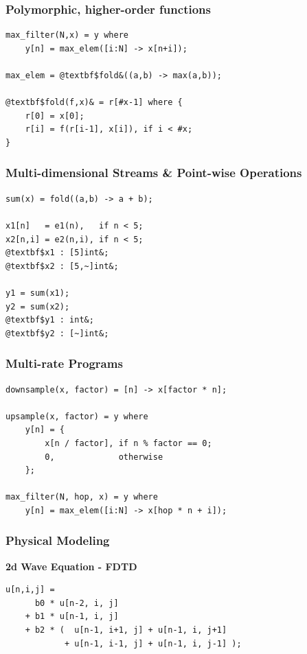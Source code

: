 \documentclass{beamer}
\begin{document}
\begin{frame}[fragile]
\frametitle{Polymorphic, higher-order functions}

\begin{center}
\begin{BVerbatim}[commandchars=@$&]
max_filter(N,x) = y where
    y[n] = max_elem([i:N] -> x[n+i]);

max_elem = @textbf$fold&((a,b) -> max(a,b));

@textbf$fold(f,x)& = r[#x-1] where {
    r[0] = x[0];
    r[i] = f(r[i-1], x[i]), if i < #x;
}
\end{BVerbatim}
\end{center}

\end{frame}



\begin{frame}[fragile]
\frametitle{Multi-dimensional Streams \& Point-wise Operations}

\begin{center}
\begin{BVerbatim}[commandchars=@$&]
sum(x) = fold((a,b) -> a + b);

x1[n]   = e1(n),   if n < 5;
x2[n,i] = e2(n,i), if n < 5;
@textbf$x1 : [5]int&;
@textbf$x2 : [5,~]int&;

y1 = sum(x1);
y2 = sum(x2);
@textbf$y1 : int&;
@textbf$y2 : [~]int&;
\end{BVerbatim}
\end{center}

\end{frame}


\begin{frame}[fragile]
\frametitle{Multi-rate Programs}

\begin{center}
\begin{BVerbatim}
downsample(x, factor) = [n] -> x[factor * n];

upsample(x, factor) = y where
    y[n] = {
        x[n / factor], if n % factor == 0;
        0,             otherwise
    };

max_filter(N, hop, x) = y where
    y[n] = max_elem([i:N] -> x[hop * n + i]);
\end{BVerbatim}
\end{center}

\end{frame}


\begin{frame}[fragile]
\frametitle{Physical Modeling}

\textbf{2d Wave Equation - FDTD\footnotemark}
\begin{center}
\begin{BVerbatim}
u[n,i,j] =
      b0 * u[n-2, i, j]
    + b1 * u[n-1, i, j]
    + b2 * (  u[n-1, i+1, j] + u[n-1, i, j+1]
            + u[n-1, i-1, j] + u[n-1, i, j-1] );
\end{BVerbatim}
\end{center}

\end{frame}
\end{document}
